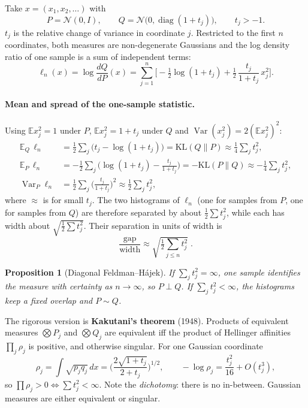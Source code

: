 \documentclass[11pt]{article}
\newtheorem{proposition}[theorem]{Proposition}
\theoremstyle{definition}
\theoremstyle{remark}
\newcommand{\N}{\mathcal N}
\newcommand{\E}{\mathbb E}
\newcommand{\KL}{\mathrm{KL}}
\begin{document}
Take $x=(x_1,x_2,\dots)$ with
\[
P=\N(0,I),\qquad Q=\N\big(0,\operatorname{diag}(1+t_j)\big),\qquad t_j>-1 .
\]
$t_j$ is the relative change of variance in coordinate $j$. Restricted to the first $n$
coordinates, both measures are non-degenerate Gaussians and the log density ratio of one sample is
a sum of independent terms:
\begin{equation}\label{eq:llr}
\ell_n(x)=\log\frac{dQ}{dP}(x)=\sum_{j=1}^n\Big[-\tfrac12\log(1+t_j)+\tfrac12\,\frac{t_j}{1+t_j}\,x_j^2\Big].
\end{equation}

\paragraph{Mean and spread of the one-sample statistic.}
Using $\E x_j^2=1$ under $P$, $\E x_j^2=1+t_j$ under $Q$ and $\operatorname{Var}(x_j^2)=2(\E x_j^2)^2$:
\begin{align*}
\E_Q\,\ell_n &= \tfrac12\sum_j\big(t_j-\log(1+t_j)\big)=\KL(Q\|P)\approx \tfrac14\sum_j t_j^2,\\
\E_P\,\ell_n &= -\tfrac12\sum_j\Big(\log(1+t_j)-\tfrac{t_j}{1+t_j}\Big)=-\KL(P\|Q)\approx -\tfrac14\sum_j t_j^2,\\
\operatorname{Var}_P\ell_n &= \tfrac12\sum_j\Big(\tfrac{t_j}{1+t_j}\Big)^2\approx \tfrac12\sum_j t_j^2 ,
\end{align*}
where $\approx$ is for small $t_j$. The two histograms of $\ell_n$ (one for samples from $P$, one
for samples from $Q$) are therefore separated by about $\tfrac12\sum t_j^2$, while each has width
about $\sqrt{\tfrac12\sum t_j^2}$. Their separation in units of width is
\[
\frac{\text{gap}}{\text{width}}\approx\sqrt{\tfrac12\textstyle\sum_{j\le n} t_j^2}\;.
\]

\begin{proposition}[Diagonal Feldman--H\'ajek]
If $\sum_j t_j^2=\infty$, one sample identifies the measure with certainty as $n\to\infty$, so
$P\perp Q$. If $\sum_j t_j^2<\infty$, the histograms keep a fixed overlap and $P\sim Q$.
\end{proposition}

The rigorous version is \textbf{Kakutani's theorem} (1948). Products of equivalent measures
$\bigotimes P_j$ and $\bigotimes Q_j$ are equivalent iff the product of Hellinger affinities
$\prod_j\rho_j$ is positive, and otherwise singular. For one Gaussian coordinate
\[
\rho_j=\int\sqrt{p_j q_j}\,dx=\Big(\frac{2\sqrt{1+t_j}}{2+t_j}\Big)^{1/2},
\qquad -\log\rho_j=\frac{t_j^2}{16}+O(t_j^3),
\]
so $\prod\rho_j>0\iff\sum t_j^2<\infty$. Note the \emph{dichotomy}: there is no in-between.
Gaussian measures are either equivalent or singular.
\end{document}
